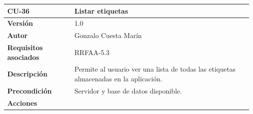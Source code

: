 \documentclass[
]{article}
\begin{document}
\begin{longtable}[]{@{}ll@{}}
\toprule
\begin{minipage}[b]{0.17\columnwidth}\raggedright
\textbf{CU-36}\strut
\end{minipage} & \begin{minipage}[b]{0.77\columnwidth}\raggedright
\textbf{Listar etiquetas}\strut
\end{minipage}\tabularnewline
\midrule
\endhead
\begin{minipage}[t]{0.17\columnwidth}\raggedright
\textbf{Versión}\strut
\end{minipage} & \begin{minipage}[t]{0.77\columnwidth}\raggedright
1.0\strut
\end{minipage}\tabularnewline
\begin{minipage}[t]{0.17\columnwidth}\raggedright
\textbf{Autor}\strut
\end{minipage} & \begin{minipage}[t]{0.77\columnwidth}\raggedright
Gonzalo Cuesta Marín\strut
\end{minipage}\tabularnewline
\begin{minipage}[t]{0.17\columnwidth}\raggedright
\textbf{Requisitos asociados}\strut
\end{minipage} & \begin{minipage}[t]{0.77\columnwidth}\raggedright
RRFAA-5.3\strut
\end{minipage}\tabularnewline
\begin{minipage}[t]{0.17\columnwidth}\raggedright
\textbf{Descripción}\strut
\end{minipage} & \begin{minipage}[t]{0.77\columnwidth}\raggedright
Permite al usuario ver una lista de todas las etiquetas almacenadas en
la aplicación.\strut
\end{minipage}\tabularnewline
\begin{minipage}[t]{0.17\columnwidth}\raggedright
\textbf{Precondición}\strut
\end{minipage} & \begin{minipage}[t]{0.77\columnwidth}\raggedright
Servidor y base de datos disponible.\strut
\end{minipage}\tabularnewline
\begin{minipage}[t]{0.17\columnwidth}\raggedright
\textbf{Acciones}\strut
\end{minipage} & \begin{minipage}[t]{0.77\columnwidth}\raggedright
\begin{enumerate}

\end{enumerate}
\end{minipage}
\end{longtable}
\end{document}
